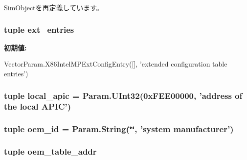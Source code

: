 \hyperlink{classm5_1_1SimObject_1_1SimObject_a17da7064bc5c518791f0c891eff05fda}{SimObject}を再定義しています。\hypertarget{classIntelMP_1_1X86IntelMPConfigTable_aef2ec381b2a36c10bceb7f9e6c443c8c}{
\subsubsection[{ext\_\-entries}]{\setlength{\rightskip}{0pt plus 5cm}tuple {\bf ext\_\-entries}}}
\label{classIntelMP_1_1X86IntelMPConfigTable_aef2ec381b2a36c10bceb7f9e6c443c8c}
{\bfseries 初期値:}
\begin{DoxyCode}
VectorParam.X86IntelMPExtConfigEntry([],
            'extended configuration table entries')
\end{DoxyCode}
\hypertarget{classIntelMP_1_1X86IntelMPConfigTable_ae4cbc39fd3b7179305a8e5ec402511df}{
\subsubsection[{local\_\-apic}]{\setlength{\rightskip}{0pt plus 5cm}tuple {\bf local\_\-apic} = Param.UInt32(0xFEE00000, 'address of the local APIC')}}
\label{classIntelMP_1_1X86IntelMPConfigTable_ae4cbc39fd3b7179305a8e5ec402511df}
\hypertarget{classIntelMP_1_1X86IntelMPConfigTable_a92058ac009c691aede73e4bf13dbbb94}{
\subsubsection[{oem\_\-id}]{\setlength{\rightskip}{0pt plus 5cm}tuple {\bf oem\_\-id} = Param.String(\char`\"{}\char`\"{}, 'system manufacturer')}}
\label{classIntelMP_1_1X86IntelMPConfigTable_a92058ac009c691aede73e4bf13dbbb94}
\hypertarget{classIntelMP_1_1X86IntelMPConfigTable_a6d9a21684fc320fcfbe4b209dbfb90af}{
\subsubsection[{oem\_\-table\_\-addr}]{\setlength{\rightskip}{0pt plus 5cm}tuple {\bf oem\_\-table\_\-addr}}}
